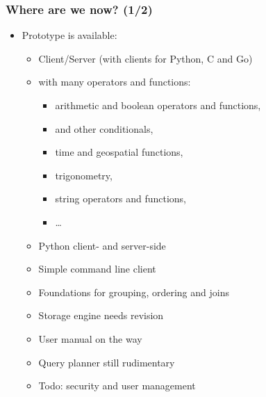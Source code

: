 \documentclass[mathserif,usenames,dvipsnames]{beamer}
\begin{document}
\begin{frame}[shrink]
\frametitle{Where are we now? (1/2)}
\begin{itemize}
\item Prototype is available:
      \bgroup
      \begin{itemize}
      \item Client/Server (with clients for Python, C and Go)
      \item {} with many operators and functions:
            \begin{itemize}
            \item arithmetic and boolean operators and functions,
            \item {} and other conditionals,
            \item time and geospatial functions,
            \item trigonometry,
            \item string operators and functions,
            \item \dots
            \end{itemize}
      \item Python client- and server-side
      \item Simple command line client
      \item Foundations for grouping, ordering and joins
      \item Storage engine needs revision
      \item User manual on the way
      \item Query planner still rudimentary
      \item Todo: security and user management
      \end{itemize}
      \egroup
\end{itemize}
\end{frame}
\end{document}

